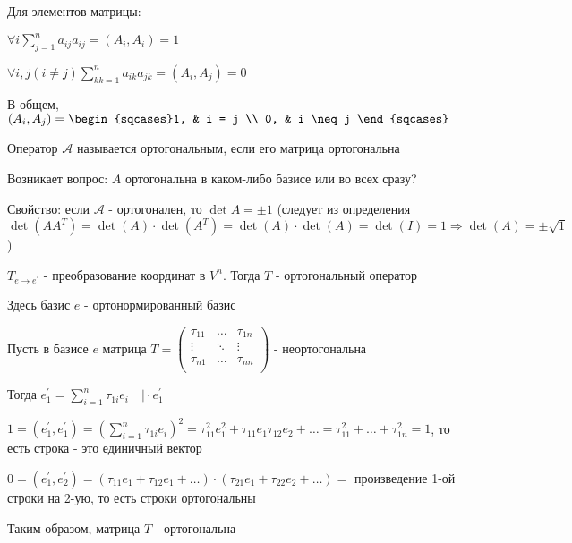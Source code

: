 \documentclass[12pt]{article}
\begin{document}
    Для элементов матрицы:

    $\forall i \sum^n_{j=1} a_{ij} a_{ij} = (A_i, A_i) = 1$

    $\forall i, j (i \neq j) \sum^n_{kk=1} a_{ik} a_{jk} = (A_i, A_j) = 0$

    В общем, $(A_i, A_j) = \begin{sqcases}1, & i = j \\ 0, & i \neq j \end{sqcases}$

    \Def Оператор $\mathcal{A}$ называется ортогональным, если его матрица ортогональна

    Возникает вопрос: $A$ ортогональна в каком-либо базисе или во всех сразу?

    Свойство: если $\mathcal{A}$ - ортогонален, то $\det A = \pm 1$ (следует из определения $\det(AA^T) = \det(A) \cdot \det(A^T) = \det(A) \cdot \det(A) = \det(I) = 1 \Longrightarrow \det(A) = \pm \sqrt{1}$)

    \begin{MyTheorem}
        \Ths $T_{e\to e^\prime}$ - преобразование координат в $V^n$. Тогда $T$ - ортогональный оператор
    \end{MyTheorem}

    Здесь базис $e$ - ортонормированный базис

    \begin{MyProof}
        Пусть в базисе $e$ матрица $T = \begin{pmatrix}
            \tau_{11} & \dots & \tau_{1n} \\
            \vdots & \ddots & \vdots \\
            \tau_{n1} & \dots & \tau_{nn} \\
        \end{pmatrix}$ - неортогональна

        Тогда $e_1^\prime = \sum_{i=1}^n \tau_{1i} e_i \quad \Big| \cdot e_1^\prime$

        $1 = (e_1^\prime, e_1^\prime) = \left(\sum_{i=1}^n \tau_{1i} e_i\right)^2 =
        \tau^2_{11} e^2_1 + \tau_{11} e_1 \tau_{12} e_2 + \dots = \tau_{11}^2 + \dots + \tau_{1n}^2 = 1$, то есть строка - это единичный вектор

        $0 = (e_1^\prime, e_2^\prime) = (\tau_{11} e_1 + \tau_{12}e_1 + \dots) \cdot
        (\tau_{21}e_1 + \tau_{22}e_2 + \dots) = $ произведение 1-ой строки на 2-ую, то есть строки ортогональны

        Таким образом, матрица $T$ - ортогональна
    \end{MyProof}
\end{document}
